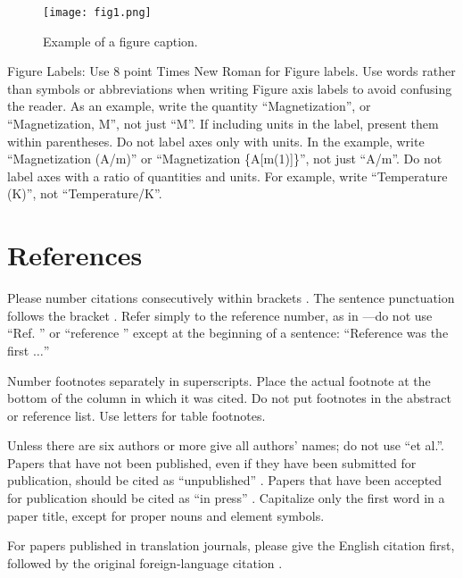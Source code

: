 \documentclass[conference]{IEEEtran}
\begin{document}
	\begin{figure}[htbp]
		\centerline{\texttt{[image: fig1.png]}}
		\caption{Example of a figure caption.}
		\label{fig}
	\end{figure}
	
	Figure Labels: Use 8 point Times New Roman for Figure labels. Use words 
	rather than symbols or abbreviations when writing Figure axis labels to 
	avoid confusing the reader. As an example, write the quantity 
	``Magnetization'', or ``Magnetization, M'', not just ``M''. If including 
	units in the label, present them within parentheses. Do not label axes only 
	with units. In the example, write ``Magnetization (A/m)'' or ``Magnetization 
	\{A[m(1)]\}'', not just ``A/m''. Do not label axes with a ratio of 
	quantities and units. For example, write ``Temperature (K)'', not 
	``Temperature/K''.
	
	
	
	\section*{References}
	
	Please number citations consecutively within brackets \cite{b1}. The 
	sentence punctuation follows the bracket \cite{b2}. Refer simply to the reference 
	number, as in \cite{b3}---do not use ``Ref. \cite{b3}'' or ``reference \cite{b3}'' except at 
	the beginning of a sentence: ``Reference \cite{b3} was the first $\ldots$''
	
	Number footnotes separately in superscripts. Place the actual footnote at 
	the bottom of the column in which it was cited. Do not put footnotes in the 
	abstract or reference list. Use letters for table footnotes.
	
	Unless there are six authors or more give all authors' names; do not use 
	``et al.''. Papers that have not been published, even if they have been 
	submitted for publication, should be cited as ``unpublished'' \cite{b4}. Papers 
	that have been accepted for publication should be cited as ``in press'' \cite{b5}. 
	Capitalize only the first word in a paper title, except for proper nouns and 
	element symbols.
	
	For papers published in translation journals, please give the English 
	citation first, followed by the original foreign-language citation \cite{b6}.
	
\end{document}
